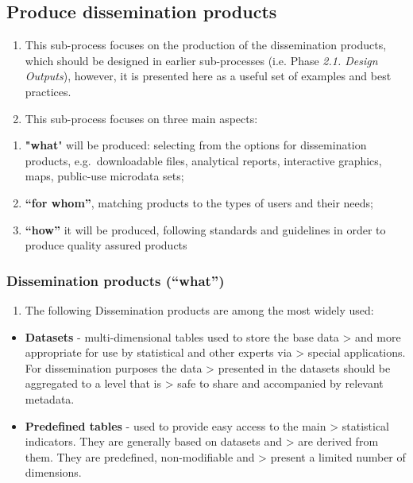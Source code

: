 \documentclass[
]{article}
\providecommand{\tightlist}{%
  \setlength{\itemsep}{0pt}\setlength{\parskip}{0pt}}
\begin{document}
\hypertarget{produce-dissemination-products}{%
\subsection{Produce dissemination products}\label{produce-dissemination-products}}

\begin{enumerate}
\def\labelenumi{\arabic{enumi}.}
\setcounter{enumi}{509}
\item
  This sub-process focuses on the production of the dissemination
  products, which should be designed in earlier sub-processes (i.e.
  Phase \emph{2.1. Design Outputs}), however, it is presented here as a
  useful set of examples and best practices.
\item
  This sub-process focuses on three main aspects:
\end{enumerate}

\begin{enumerate}
\def\labelenumi{\roman{enumi}.}
\item
  \textbf{"what}" will be produced: selecting from the options for
  dissemination products, e.g.~downloadable files, analytical reports,
  interactive graphics, maps, public-use microdata sets;
\item
  \textbf{``for whom''}, matching products to the types of users and their
  needs;
\item
  \textbf{``how''} it will be produced, following standards and guidelines
  in order to produce quality assured products
\end{enumerate}

\hypertarget{dissemination-products-what}{%
\subsubsection{Dissemination products (``what'')}\label{dissemination-products-what}}

\begin{enumerate}
\def\labelenumi{\arabic{enumi}.}
\setcounter{enumi}{511}
\tightlist
\item
  The following Dissemination products are among the most widely
  used:
\end{enumerate}

\begin{itemize}
\item
  \textbf{Datasets} - multi-dimensional tables used to store the base data
  \textgreater{} and more appropriate for use by statistical and other experts via
  \textgreater{} special applications. For dissemination purposes the data
  \textgreater{} presented in the datasets should be aggregated to a level that is
  \textgreater{} safe to share and accompanied by relevant metadata.
\item
  \textbf{Predefined tables} - used to provide easy access to the main
  \textgreater{} statistical indicators. They are generally based on datasets and
  \textgreater{} are derived from them. They are predefined, non-modifiable and
  \textgreater{} present a limited number of dimensions.
\end{itemize}
\end{document}
